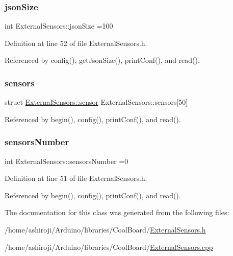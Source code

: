 \subsubsection{\texorpdfstring{json\+Size}{jsonSize}}
{\footnotesize\ttfamily int External\+Sensors\+::json\+Size =100\hspace{0.3cm}{\ttfamily [private]}}



Definition at line 52 of file External\+Sensors.\+h.



Referenced by config(), get\+Json\+Size(), print\+Conf(), and read().

\mbox{\label{classExternalSensors_a284233f884fcf00154a44740cf1d9e1e}} 
\subsubsection{\texorpdfstring{sensors}{sensors}}
{\footnotesize\ttfamily struct \hyperlink{structExternalSensors_1_1sensor}{External\+Sensors\+::sensor} External\+Sensors\+::sensors\mbox{[}50\mbox{]}\hspace{0.3cm}{\ttfamily [private]}}



Referenced by begin(), config(), print\+Conf(), and read().

\mbox{\label{classExternalSensors_a58e4fbf9adeae787d92be5fa33043b5d}} 
\subsubsection{\texorpdfstring{sensors\+Number}{sensorsNumber}}
{\footnotesize\ttfamily int External\+Sensors\+::sensors\+Number =0\hspace{0.3cm}{\ttfamily [private]}}



Definition at line 51 of file External\+Sensors.\+h.



Referenced by begin(), config(), print\+Conf(), and read().



The documentation for this class was generated from the following files\+:\begin{DoxyCompactItemize}
\item 
/home/ashiroji/\+Arduino/libraries/\+Cool\+Board/\hyperlink{ExternalSensors_8h}{External\+Sensors.\+h}\item 
/home/ashiroji/\+Arduino/libraries/\+Cool\+Board/\hyperlink{ExternalSensors_8cpp}{External\+Sensors.\+cpp}\end{DoxyCompactItemize}
